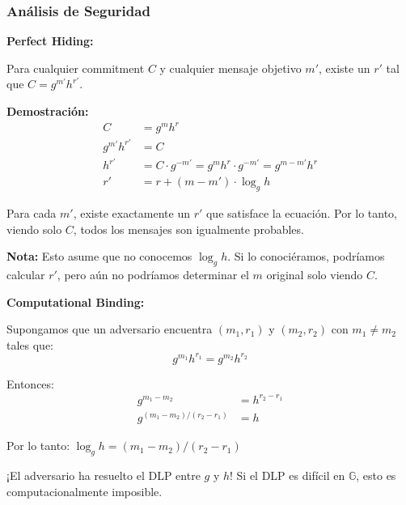 \documentclass[11pt,a4paper,twoside,openright]{book}
\theoremstyle{definition}
\theoremstyle{plain}
\theoremstyle{remark}
\begin{document}
\begin{center}
\end{center}

\subsubsection{Análisis de Seguridad}

\begin{mathnote}
\textbf{Perfect Hiding:}

Para cualquier commitment $C$ y cualquier mensaje objetivo $m'$, existe un $r'$ tal que $C = g^{m'} h^{r'}$.

\textbf{Demostración:}
\begin{align}
C &= g^m h^r \\
g^{m'} h^{r'} &= C \\
h^{r'} &= C \cdot g^{-m'} = g^m h^r \cdot g^{-m'} = g^{m-m'} h^r \\
r' &= r + (m - m') \cdot \log_g h
\end{align}

Para cada $m'$, existe exactamente un $r'$ que satisface la ecuación. Por lo tanto, viendo solo $C$, todos los mensajes son igualmente probables.

\textbf{Nota:} Esto asume que no conocemos $\log_g h$. Si lo conociéramos, podríamos calcular $r'$, pero aún no podríamos determinar el $m$ original solo viendo $C$.
\end{mathnote}

\begin{mathnote}
\textbf{Computational Binding:}

Supongamos que un adversario encuentra $(m_1, r_1)$ y $(m_2, r_2)$ con $m_1 \neq m_2$ tales que:
\[ g^{m_1} h^{r_1} = g^{m_2} h^{r_2} \]

Entonces:
\begin{align}
g^{m_1 - m_2} &= h^{r_2 - r_1} \\
g^{(m_1 - m_2) / (r_2 - r_1)} &= h
\end{align}

Por lo tanto: $\log_g h = (m_1 - m_2) / (r_2 - r_1)$

¡El adversario ha resuelto el DLP entre $g$ y $h$! Si el DLP es difícil en $\mathbb{G}$, esto es computacionalmente imposible.
\end{mathnote}
\end{document}
